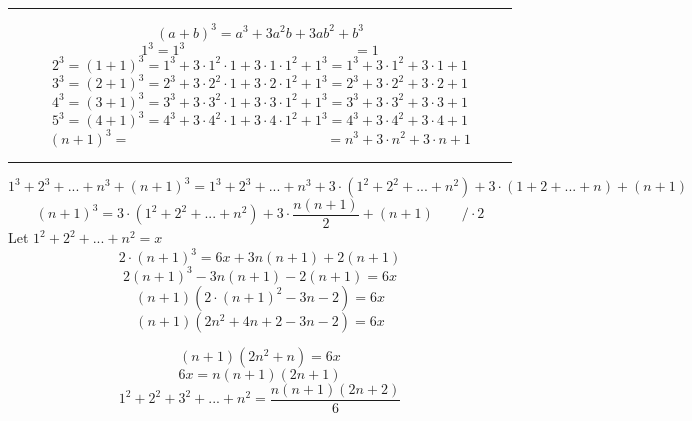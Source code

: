 \documentclass{article}
\begin{document}
\hrule

\[
(a + b)^3 = a^3 + 3a^2b + 3ab^2 + b^3
\]
\[
1^3 = 1^3\qquad\qquad\qquad\qquad\qquad\qquad = 1
\]
\[
2^3 = (1 + 1)^3 = 1^3 + 3 \cdot 1^2 \cdot 1 + 3 \cdot 1 \cdot 1^2 + 1^3 = 1^3 + 3 \cdot 1^2 + 3 \cdot 1 + 1
\]
\[
3^3 = (2 + 1)^3 = 2^3 + 3 \cdot 2^2 \cdot 1 + 3 \cdot 2 \cdot 1^2 + 1^3 = 2^3 + 3\cdot 2^2 + 3\cdot 2 + 1
\]
\[
4^3 = (3 + 1)^3 = 3^3 + 3 \cdot 3^2 \cdot 1 + 3\cdot3\cdot1^2 + 1^3 = 3^3 + 3 \cdot 3^2 + 3 \cdot 3 + 1
\]
\[
5^3 = (4 + 1)^3 = 4^3 + 3 \cdot 4^2 \cdot 1 + 3 \cdot 4 \cdot 1^2+ 1^3 = 4^3 + 3 \cdot 4^2 + 3\cdot 4 + 1
\]
\[
(n + 1)^3 = \qquad\qquad\qquad\qquad\qquad\qquad\qquad = n^3 + 3\cdot n^2 + 3\cdot n + 1
\]

\hrule

\[
1^3 + 2^3 + ... + n^3 + (n + 1)^3 = 1^3 + 2^3 + ... + n^3 + 3 \cdot(1^2 + 2^2 + ... + n^2) + 3 \cdot (1 + 2 + ... + n) + (n + 1)
\]
\[
(n + 1)^3 = 3 \cdot (1^2 + 2^2 + ... +  n^2) + 3\cdot \frac{n(n + 1)}{2} + (n + 1) \qquad /\cdot2
\]
Let $1^2 + 2^2 + ... + n^2 = x$
\[
2\cdot(n + 1)^3 = 6x + 3n(n+1) + 2(n + 1) 
\]
\[
2(n + 1)^3 - 3n(n+1) - 2(n + 1) = 6x 
\]
\[
(n + 1) ( 2 \cdot(n + 1)^2 - 3n - 2) = 6x
\]
\[
(n + 1) (2n^2 + 4n + 2 - 3n - 2) = 6x
\]

\[
(n + 1)(2n^2 + n) = 6x
\]
\[
6x = n(n+1)(2n+1)
\]
\[
1^2 + 2^2 + 3^2 + ... + n^2 = \frac{n(n + 1)(2n + 2)}{6}
\]

\end{document}
